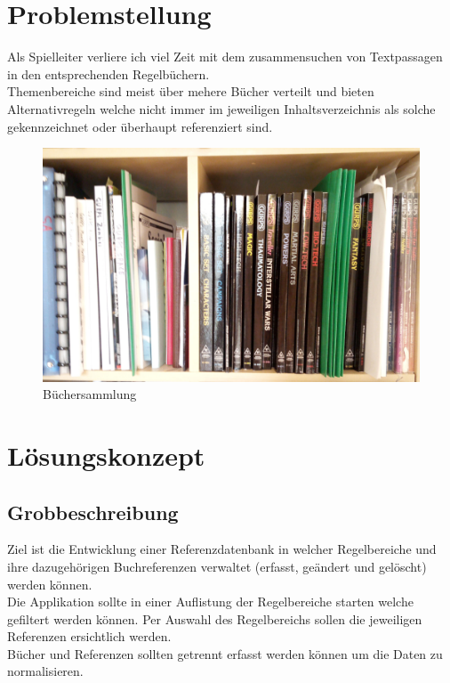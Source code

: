 \section{Problemstellung}
Als Spielleiter verliere ich viel Zeit mit dem zusammensuchen von Textpassagen in den entsprechenden Regelbüchern.\\
Themenbereiche sind meist über mehere Bücher verteilt und bieten Alternativregeln welche nicht immer im jeweiligen Inhaltsverzeichnis als solche gekennzeichnet oder überhaupt referenziert sind.\\

\begin{figure}
\includegraphics[width=\textwidth]{regal.jpg}
\caption{Büchersammlung}
\end{figure}

\section{Lösungskonzept}
\subsection{Grobbeschreibung}
Ziel ist die Entwicklung einer Referenzdatenbank in welcher Regelbereiche und ihre dazugehörigen Buchreferenzen verwaltet (erfasst, geändert und gelöscht) werden können.\\
Die Applikation sollte in einer Auflistung der Regelbereiche starten welche gefiltert werden können. Per Auswahl des Regelbereichs sollen die jeweiligen Referenzen ersichtlich werden.\\ Bücher und Referenzen sollten getrennt erfasst werden können um die Daten zu normalisieren.
\newpage
